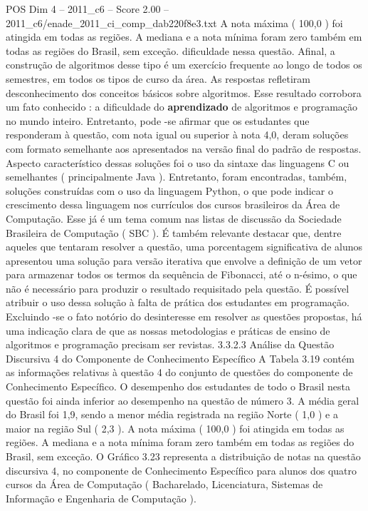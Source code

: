 \begin{textsample}{POS Dim 4 – 2011\_c6 – Score 2.00 – 2011\_c6/enade\_2011\_ci\_comp\_dab220f8e3.txt}
A nota máxima ( 100,0 ) foi atingida em todas as regiões.
A mediana e a nota mínima foram zero também em todas as regiões do Brasil, sem exceção. dificuldade nessa questão.
Afinal, a construção de algoritmos desse tipo é um exercício frequente ao longo de todos os semestres, em todos os tipos de curso da área.
As respostas refletiram desconhecimento dos conceitos básicos sobre algoritmos.
Esse resultado corrobora um fato conhecido : a dificuldade do \textbf{aprendizado} de algoritmos e programação no mundo inteiro.
Entretanto, pode -se afirmar que os estudantes que responderam à questão, com nota igual ou superior à nota 4,0, deram soluções com formato semelhante aos apresentados na versão final do padrão de respostas.
Aspecto característico dessas soluções foi o uso da sintaxe das linguagens C ou semelhantes ( principalmente Java ).
Entretanto, foram encontradas, também, soluções construídas com o uso da linguagem Python, o que pode indicar o crescimento dessa linguagem nos currículos dos cursos brasileiros da Área de Computação.
Esse já é um tema comum nas listas de discussão da Sociedade Brasileira de Computação ( SBC ).
É também relevante destacar que, dentre aqueles que tentaram resolver a questão, uma porcentagem significativa de alunos apresentou uma solução para versão iterativa que envolve a definição de um vetor para armazenar todos os termos da sequência de Fibonacci, até o n-ésimo, o que não é necessário para produzir o resultado requisitado pela questão.
É possível atribuir o uso dessa solução à falta de prática dos estudantes em programação.
Excluindo -se o fato notório do desinteresse em resolver as questões propostas, há uma indicação clara de que as nossas metodologias e práticas de ensino de algoritmos e programação precisam ser revistas. 3.3.2.3 Análise da Questão Discursiva 4 do Componente de Conhecimento Específico A Tabela 3.19 contém as informações relativas à questão 4 do conjunto de questões do componente de Conhecimento Específico.
O desempenho dos estudantes de todo o Brasil nesta questão foi ainda inferior ao desempenho na questão de número 3.
A média geral do Brasil foi 1,9, sendo a menor média registrada na região Norte ( 1,0 ) e a maior na região Sul ( 2,3 ).
A nota máxima ( 100,0 ) foi atingida em todas as regiões.
A mediana e a nota mínima foram zero também em todas as regiões do Brasil, sem exceção.
O Gráfico 3.23 representa a distribuição de notas na questão discursiva 4, no componente de Conhecimento Específico para alunos dos quatro cursos da Área de Computação ( Bacharelado, Licenciatura, Sistemas de Informação e Engenharia de Computação ).

\end{textsample}
